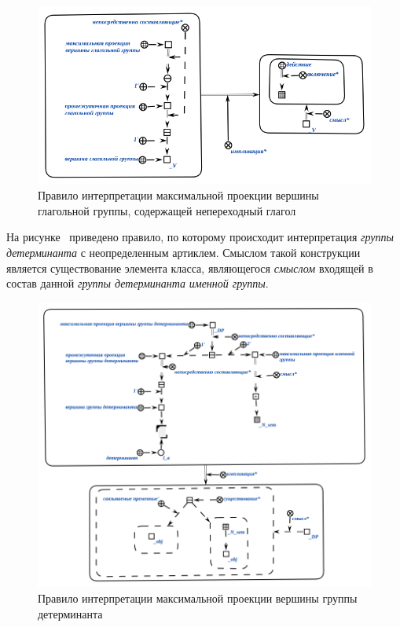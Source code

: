 \begin{figure}[h]
    \centering
    \includegraphics[scale=0.8]{images/part2/chapter_lang/d_sem_3}
    \caption{Правило интерпретации максимальной проекции вершины глагольной группы, содержащей непереходный глагол}
    \label{fig:d_sem_3}
\end{figure}

На рисунке~\textit{} приведено правило, по которому происходит интерпретация \textit{группы детерминанта} с неопределенным артиклем.
Смыслом такой конструкции является существование элемента класса, являющегося \textit{смыслом} входящей в состав данной \textit{группы детерминанта} \textit{именной группы}.

\begin{figure}[h]
    \centering
    \includegraphics[scale=0.8]{images/part2/chapter_lang/d_sem_4}
    \caption{Правило интерпретации максимальной проекции вершины группы детерминанта}
    \label{d_sem_4}
\end{figure}

